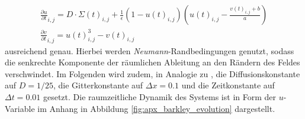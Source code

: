 \begin{equation}
\begin{gathered}
\frac{\partial u}{\partial t}_{i,j} = D \cdot \Sigma(t)_{i,j} + \frac{1}{\epsilon} (1-u(t)_{i,j}) \left(u(t)_{i,j}-\frac{v(t)_{i,j}+b}{a}\right)\\
\frac{\partial v}{\partial t}_{i,j} = u(t)_{i,j}^3-v(t)_{i,j}
\end{gathered}
\end{equation}
ausreichend genau. Hierbei werden \textit{Neumann}-Randbedingungen genutzt, sodass die senkrechte Komponente der räumlichen Ableitung an den Rändern des Feldes verschwindet. Im Folgenden wird zudem, in Analogie zu \citep{berg2011synchronization}, die Diffusionskonstante auf $D = 1/25$, die Gitterkonstante auf $\Delta x = 0.1$ und die Zeitkonstante auf $\Delta t = 0.01$ gesetzt. Die raumzeitliche Dynamik des Systems ist in Form der $u$-Variable im Anhang in Abbildung \ref{fig:apx_barkley_evolution} dargestellt.